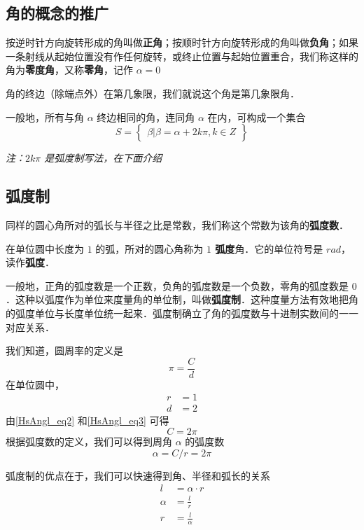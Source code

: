 
\subsection{角的概念的推广}
按逆时针方向旋转形成的角叫做\textbf{正角}；按顺时针方向旋转形成的角叫做\textbf{负角}；如果一条射线从起始位置没有作任何旋转，或终止位置与起始位置重合，我们称这样的角为\textbf{零度角}，又称\textbf{零角}，记作 $\alpha = 0$

角的终边（除端点外）在第几象限，我们就说这个角是第几象限角．

一般地，所有与角 $\alpha$ 终边相同的角，连同角 $\alpha$ 在内，可构成一个集合
\begin{equation}
S = \begin{Bmatrix} \beta|\beta=\alpha+2k\pi,k \in Z \end{Bmatrix}
\end{equation}

\textsl{注：$2k\pi$ 是弧度制写法，在下面介绍}

\subsection{弧度制}
同样的圆心角所对的弧长与半径之比是常数，我们称这个常数为该角的\textbf{弧度数}．

在单位圆中长度为 $1$ 的弧，所对的圆心角称为 \textbf{$1$ 弧度}角．它的单位符号是 $rad$，读作\textbf{弧度}．

一般地，正角的弧度数是一个正数，负角的弧度数是一个负数，零角的弧度数是 $0$．这种以弧度作为单位来度量角的单位制，叫做\textbf{弧度制}．这种度量方法有效地把角的弧度单位与长度单位统一起来．弧度制确立了角的弧度数与十进制实数间的一一对应关系．

我们知道，圆周率的定义是
\begin{equation}\label{HsAngl_eq2}
\pi = \frac{C}{d}
\end{equation}
在单位圆中，
\begin{equation}\label{HsAngl_eq3}
\begin{aligned}
r &= 1\\
d &= 2
\end{aligned}
\end{equation}
由\autoref{HsAngl_eq2} 和\autoref{HsAngl_eq3} 可得
\begin{equation}
C = 2\pi
\end{equation}
根据弧度数的定义，我们可以得到周角 $\alpha$ 的弧度数
\begin{equation}
\alpha = C / r = 2\pi
\end{equation}

弧度制的优点在于，我们可以快速得到角、半径和弧长的关系
\begin{equation}
\begin{aligned}
l &= \alpha \cdot r \\
\alpha &= \frac{l}{r} \\
r &= \frac{l}{\alpha}
\end{aligned}
\end{equation}
